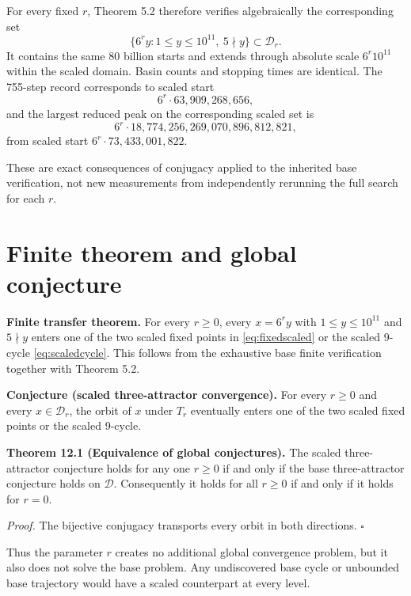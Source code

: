 \documentclass[11pt]{article}
\begin{document}
For every fixed $r$, Theorem 5.2 therefore verifies algebraically the corresponding set
\begin{equation}\{6^r y:1\le y\le10^{11},\ 5\nmid y\}\subset\mathcal D_r.\label{eq:verifiedset}\end{equation}
It contains the same $80$ billion starts and extends through absolute scale $6^r10^{11}$ within the scaled domain. Basin counts and stopping times are identical. The 755-step record corresponds to scaled start
\[
6^r\cdot63{,}909{,}268{,}656,
\]
and the largest reduced peak on the corresponding scaled set is
\[
6^r\cdot18{,}774{,}256{,}269{,}070{,}896{,}812{,}821,
\]
from scaled start $6^r\cdot73{,}433{,}001{,}822$.

These are exact consequences of conjugacy applied to the inherited base verification, not new measurements from independently rerunning the full search for each $r$.

\section{Finite theorem and global conjecture}
\textbf{Finite transfer theorem.} For every $r\ge0$, every $x=6^r y$ with $1\le y\le10^{11}$ and $5\nmid y$ enters one of the two scaled fixed points in \eqref{eq:fixedscaled} or the scaled 9-cycle \eqref{eq:scaledcycle}. This follows from the exhaustive base finite verification together with Theorem 5.2.

\textbf{Conjecture (scaled three-attractor convergence).} For every $r\ge0$ and every $x\in\mathcal D_r$, the orbit of $x$ under $T_r$ eventually enters one of the two scaled fixed points or the scaled 9-cycle.

\textbf{Theorem 12.1 (Equivalence of global conjectures).} The scaled three-attractor conjecture holds for any one $r\ge0$ if and only if the base three-attractor conjecture holds on $\mathcal D$. Consequently it holds for all $r\ge0$ if and only if it holds for $r=0$.

\textit{Proof.} The bijective conjugacy transports every orbit in both directions. \hfill$\square$

Thus the parameter $r$ creates no additional global convergence problem, but it also does not solve the base problem. Any undiscovered base cycle or unbounded base trajectory would have a scaled counterpart at every level.
\end{document}
